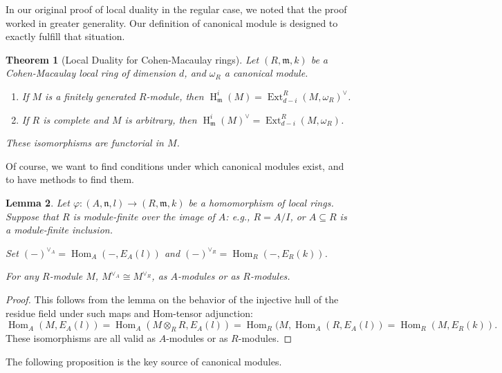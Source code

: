 \documentclass[11pt]{book}
\newtheorem{theorem}{Theorem}[chapter]
\newtheorem{lemma}[theorem]{Lemma}
\numberwithin{equation}{section}
\numberwithin{theorem}{chapter}
\theoremstyle{definition}
\newtheorem*{basic properties}{Basic Properties}
\newtheorem*{Important Remark}{Important Remark}
\theoremstyle{remark}
\newcommand{\m}{\mathfrak{m}}
\newcommand{\n}{\mathfrak{n}}
\newcommand{\Hom}{\operatorname{Hom}}
\newcommand{\Ext}{\operatorname{Ext}}
\renewcommand{\H}{\operatorname{H}}
\begin{document}
In our original proof of local duality in the regular case, we noted that the proof worked in greater generality. Our definition of canonical module is designed to exactly fulfill that situation.

\begin{theorem}[Local Duality for Cohen-Macaulay rings] Let $(R,\m,k)$ be a Cohen-Macaulay local ring of dimension $d$, and $\omega_R$ a canonical module.
	\begin{enumerate}
		\item If $M$ is a finitely generated $R$-module, then $\H^i_\m(M) = \Ext^R_{d-i}(M,\omega_R)^{\vee}$.
		\item If $R$ is complete and $M$ is arbitrary, then $\H^i_\m(M)^{\vee} = \Ext^R_{d-i}(M,\omega_R)$.
	\end{enumerate}
These isomorphisms are functorial in $M$.
\end{theorem}

	Of course, we want to find conditions under which canonical modules exist, and to have methods to find them.
	
	\begin{lemma}
		Let $\varphi:(A,\n,l) \to (R,\m,k)$ be a homomorphism of local rings. Suppose that $R$ is module-finite over the image of $A$: e.g., $R=A/I$, or $A\subseteq R$ is a module-finite inclusion.
		
		Set $(-)^{\vee_A}=\Hom_A(-,E_A(l))$ and $(-)^{\vee_R}=\Hom_R(-,E_R(k))$.
		
		For any $R$-module $M$, $M^{\vee_A}\cong M^{\vee_R}$, as $A$-modules or as $R$-modules.
	\end{lemma}
\begin{proof}
	This follows from the lemma on the behavior of the injective hull of the residue field under such maps and Hom-tensor adjunction:
	\[ \Hom_A(M,E_A(l))= \Hom_A(M \otimes_R R ,E_A(l))=\Hom_R(M, \Hom_A( R ,E_A(l))= \Hom_R(M,E_R(k)).  \]
	These isomorphisms are all valid as $A$-modules or as $R$-modules. 
\end{proof}

The following proposition is the key source of canonical modules.
\end{document}
